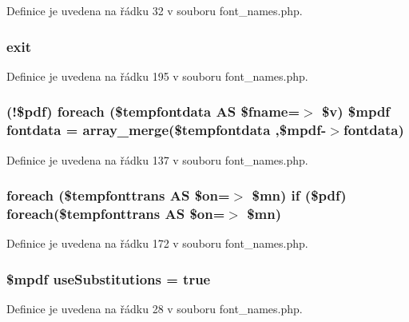 Definice je uvedena na řádku 32 v souboru font\-\_\-names.\-php.

\hypertarget{font__names_8php_a6733eb5f605d09eaede9845835d71c4e}{
\subsubsection[{exit}]{\setlength{\rightskip}{0pt plus 5cm}exit}}\label{font__names_8php_a6733eb5f605d09eaede9845835d71c4e}


Definice je uvedena na řádku 195 v souboru font\-\_\-names.\-php.

\hypertarget{font__names_8php_a6f52753c29baf5d9c89eee86926d9d04}{
\subsubsection[{fontdata}]{ (!\$pdf) {\bf foreach} (\$tempfontdata A\-S \$fname=$>$ \$v) \$mpdf fontdata = array\-\_\-merge(\$tempfontdata ,\$mpdf-\/$>$fontdata)}}\label{font__names_8php_a6f52753c29baf5d9c89eee86926d9d04}


Definice je uvedena na řádku 137 v souboru font\-\_\-names.\-php.

\hypertarget{font__names_8php_ac6e05d8eea8274a71f8f9c686e891421}{
\subsubsection[{foreach}]{\setlength{\rightskip}{0pt plus 5cm}foreach (\$tempfonttrans A\-S \$on=$>$ \$mn) {\bf if} (\$pdf) foreach(\$tempfonttrans A\-S \$on=$>$ \$mn)}}\label{font__names_8php_ac6e05d8eea8274a71f8f9c686e891421}


Definice je uvedena na řádku 172 v souboru font\-\_\-names.\-php.

\hypertarget{font__names_8php_aa2ce4c2c0ab99d3365e4d7366a9be33a}{
\subsubsection[{use\-Substitutions}]{\setlength{\rightskip}{0pt plus 5cm}\$mpdf use\-Substitutions = true}}\label{font__names_8php_aa2ce4c2c0ab99d3365e4d7366a9be33a}


Definice je uvedena na řádku 28 v souboru font\-\_\-names.\-php.

